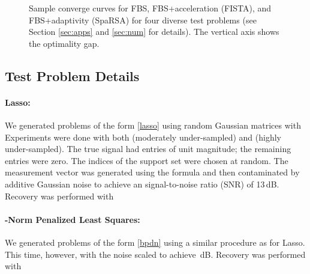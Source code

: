 \documentclass{amsart}
\theoremstyle{definition}
\begin{document}
\begin{figure}[t]
\vspace{-0.2cm}
\centering
{}
\hspace{0.9cm}
\vspace{-0.2cm}
\hspace{0.9cm}
\vspace{-0.1cm}
\caption{Sample converge curves for FBS, FBS+acceleration (FISTA), and FBS+adaptivity (SpaRSA) for four diverse test problems (see Section \ref{sec:apps} and \ref{sec:num} for details). The vertical axis shows the optimality gap. }
\label{fig:curves}
\vspace{-0.3cm}
\end{figure} 

\newpage
\subsection{Test Problem Details}


\paragraph{\textbf{Lasso:}}\label{sec:lassoRes}

We generated problems of the form \eqref{lasso} using random Gaussian matrices  with  Experiments were done with both  (moderately under-sampled) and  (highly under-sampled).  The true signal  had  entries of unit magnitude; the remaining entries were zero.   The indices of the support set were chosen at random.    The measurement vector was generated using the formula  and then contaminated by additive Gaussian noise to achieve an signal-to-noise ratio (SNR) of 13\,dB. Recovery was  performed with 

\paragraph{\textbf{-Norm Penalized Least Squares:}}

We generated problems of the form \eqref{bpdn} using a similar procedure as for Lasso. This time, however, with the noise scaled to achieve \,dB. Recovery was performed with 
\end{document}

